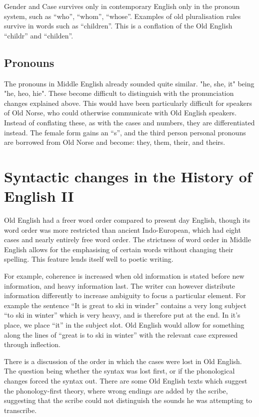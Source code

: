 \documentclass[12pt]{report}
\begin{document}
Gender and Case survives only in contemporary English only in the pronoun
system, such as ``who'', ``whom'', ``whose''. Examples of old pluralisation
rules survive in words such as ``children''. This is a conflation of the Old
English ``childr'' and ``childen''.

\section{Pronouns}

The pronouns in Middle English already sounded quite similar. "he, she, it"
being "he, heo, hie". These become difficult to distinguish with the
pronunciation changes explained above. This would have been particularly
difficult for speakers of Old Norse, who could otherwise communicate with Old
English speakers. Instead of conflating these, as with the cases and numbers,
they are differentiated instead. The female form gains an ``s'', and the third
person personal pronouns are borrowed from Old Norse and become: they, them,
their, and theirs. 

\chapter{Syntactic changes in the History of English II}

Old English had a freer word order compared to present day English, though its
word order was more restricted than ancient Indo-European, which had eight cases
and nearly entirely free word order. The strictness of word order in Middle
English allows for the emphasising of certain words without changing their
spelling. This feature lends itself well to poetic writing.

For example, coherence is increased when old information is stated before new
information, and heavy information last. The writer can however
distribute information differently to increase ambiguity to focus a particular
element. For example the sentence ``It is great to ski in winder'' contains a
very long subject ``to ski in winter'' which is very heavy, and is therefore put
at the end. In it's place, we place ``it'' in the subject slot. Old English
would allow for something along the lines of ``great is to ski in winter'' with
the relevant case expressed through inflection.

There is a discussion of the order in which the cases were lost in Old English.
The question being whether the syntax was lost first, or if the phonological
changes forced the syntax out. There are some Old English texts which suggest
the phonology-first theory, where wrong endings are added by the scribe,
suggesting that the scribe could not distinguish the sounds he was attempting to
transcribe.
\end{document}
